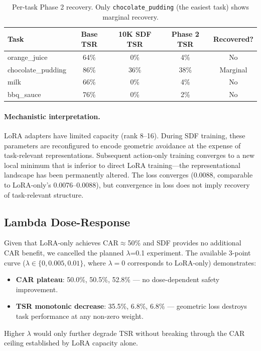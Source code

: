 \documentclass[letterpaper]{article}
\begin{document}
\begin{table}[t]
\centering
\caption{Per-task Phase 2 recovery. Only \texttt{chocolate\_pudding} (the easiest task) shows marginal recovery.}
\label{tab:phase2_tasks}
\begin{tabular}{lcccc}
\toprule
Task & Base TSR & 10K SDF TSR & Phase 2 TSR & Recovered? \\
\midrule
orange\_juice & 64\% & 0\% & 4\% & No \\
chocolate\_pudding & 86\% & 36\% & 38\% & Marginal \\
milk & 66\% & 0\% & 4\% & No \\
bbq\_sauce & 76\% & 0\% & 2\% & No \\
\bottomrule
\end{tabular}
\end{table}

\paragraph{Mechanistic interpretation.} LoRA adapters have limited capacity (rank 8--16). During SDF training, these parameters are reconfigured to encode geometric avoidance at the expense of task-relevant representations. Subsequent action-only training converges to a new local minimum that is inferior to direct LoRA training---the representational landscape has been permanently altered. The loss converges (0.0088, comparable to LoRA-only's 0.0076--0.0088), but convergence in loss does not imply recovery of task-relevant structure.

\subsection{Lambda Dose-Response}
\label{sec:exp_lambda}

Given that LoRA-only achieves CAR$\approx$50\% and SDF provides no additional CAR benefit, we cancelled the planned $\lambda$=0.1 experiment. The available 3-point curve ($\lambda \in \{0, 0.005, 0.01\}$, where $\lambda=0$ corresponds to LoRA-only) demonstrates:
\begin{itemize}
    \item \textbf{CAR plateau}: 50.0\%, 50.5\%, 52.8\% --- no dose-dependent safety improvement.
    \item \textbf{TSR monotonic decrease}: 35.5\%, 6.8\%, 6.8\% --- geometric loss destroys task performance at any non-zero weight.
\end{itemize}

Higher $\lambda$ would only further degrade TSR without breaking through the CAR ceiling established by LoRA capacity alone.
\end{document}
